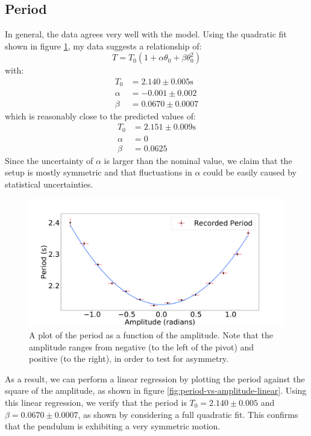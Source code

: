 \documentclass[%
 reprint,
 amsmath,amssymb
 aps,
]{revtex4-2}
\begin{document}
\subsection{Period}
In general, the data agrees very well with the model. Using the quadratic fit shown in figure \ref{fig:period-vs-amplitude}, my data suggests a relationship of:
\begin{equation}
    T = T_0\left(1+\alpha \theta_0 +\beta\theta_0^2\right)
    \label{eq:}
\end{equation}
with:
\begin{align}
    T_0 &= 2.140 \pm 0.005 \si{\second} \\ 
    \alpha &= -0.001 \pm 0.002\\
    \beta &= 0.0670 \pm 0.0007
\end{align}
which is reasonably close to the predicted values of:
\begin{align}
    T_0 &= 2.151 \pm 0.009 \si{\second} \\ 
    \alpha &= 0 \\ 
    \beta &= 0.0625
    \label{eq:}
\end{align}
Since the uncertainty of $\alpha$ is larger than the nominal value, we claim that the setup is mostly symmetric and that fluctuations in $\alpha$ could be easily caused by statistical uncertainties.
\begin{figure}[!h]
    \includegraphics[width=\linewidth]{Figures/period-vs-amplitude.png}

    \caption{A plot of the period as a function of the amplitude. Note that the amplitude ranges from negative (to the left of the pivot) and positive (to the right), in order to test for asymmetry.}
    \label{fig:period-vs-amplitude}
\end{figure}
As a result, we can perform a linear regression by plotting the period against the square of the amplitude, as shown in figure \ref{fig:period-vs-amplitude-linear}. Using this linear regression, we verify that the period is $T_0=2.140 \pm 0.005$ and $\beta = 0.0670 \pm 0.0007$, as shown by considering a full quadratic fit. This confirms that the pendulum is exhibiting a very symmetric motion.
\end{document}
